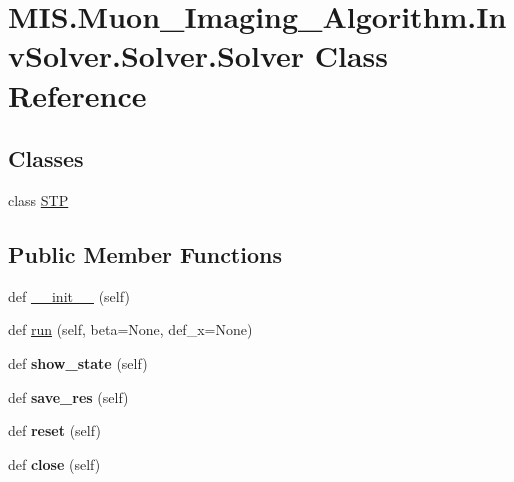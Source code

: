 \hypertarget{classMIS_1_1Muon__Imaging__Algorithm_1_1InvSolver_1_1Solver_1_1Solver}{}\section{M\+I\+S.\+Muon\+\_\+\+Imaging\+\_\+\+Algorithm.\+Inv\+Solver.\+Solver.\+Solver Class Reference}
\label{classMIS_1_1Muon__Imaging__Algorithm_1_1InvSolver_1_1Solver_1_1Solver}
\subsection*{Classes}
\begin{DoxyCompactItemize}
\item 
class \hyperlink{classMIS_1_1Muon__Imaging__Algorithm_1_1InvSolver_1_1Solver_1_1Solver_1_1STP}{S\+TP}
\end{DoxyCompactItemize}
\subsection*{Public Member Functions}
\begin{DoxyCompactItemize}
\item 
def \hyperlink{classMIS_1_1Muon__Imaging__Algorithm_1_1InvSolver_1_1Solver_1_1Solver_a1506124c55af1fe081fa3351ea67d057}{\+\_\+\+\_\+init\+\_\+\+\_\+} (self)
\item 
def \hyperlink{classMIS_1_1Muon__Imaging__Algorithm_1_1InvSolver_1_1Solver_1_1Solver_aa77aa963efebdb4c35f37d50c921899c}{run} (self, beta=None, def\+\_\+x=None)
\item 
\mbox{\label{classMIS_1_1Muon__Imaging__Algorithm_1_1InvSolver_1_1Solver_1_1Solver_aba8b476c79e4cae0a100865c912342fe}} 
def {\bfseries show\+\_\+state} (self)
\item 
\mbox{\label{classMIS_1_1Muon__Imaging__Algorithm_1_1InvSolver_1_1Solver_1_1Solver_ad966f14a73d87c8a98cafe1e8f07ffc2}} 
def {\bfseries save\+\_\+res} (self)
\item 
\mbox{\label{classMIS_1_1Muon__Imaging__Algorithm_1_1InvSolver_1_1Solver_1_1Solver_a803eca029a8a2c41cd3f4bdb2cfeb4ed}} 
def {\bfseries reset} (self)
\item 
\mbox{\label{classMIS_1_1Muon__Imaging__Algorithm_1_1InvSolver_1_1Solver_1_1Solver_ac6bc47f72bc0edd755dafc3d5c92a541}} 
def {\bfseries close} (self)
\end{DoxyCompactItemize}
